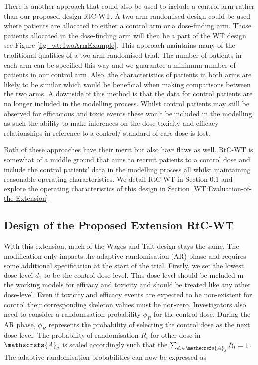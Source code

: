 There is another approach that could also be used to include a control arm rather than our proposed design RtC-WT. A two-arm randomised design could be used where patients are allocated to either a control arm or a dose-finding arm. Those patients allocated in the dose-finding arm will then be a part of the WT design see Figure \ref{fig_wt:TwoArmExample}. This approach maintains many of the traditional qualities of a two-arm randomised trial. The number of patients in each arm can be specified this way and we guarantee a minimum number of patients in our control arm. Also, the characteristics of patients in both arms are likely to be similar which would be beneficial when making comparisons between the two arms. A downside of this method is that the data for control patients are no longer included in the modelling process. Whilst control patients may still be observed for efficacious and toxic events these won't be included in the modelling as such the ability to make inferences on the dose-toxicity and efficacy relationships in reference to a control/ standard of care dose is lost. 

Both of these approaches have their merit but also have flaws as well. RtC-WT is somewhat of a middle ground that aims to recruit patients to a control dose and include the control patients' data in the modelling process all whilst maintaining reasonable operating characteristics. We detail RtC-WT in Section \ref{WT:Design-RtC-WT} and explore the operating characteristics of this design in Section \ref{WT:Evaluation-of-the-Extension}.

\subsection{Design of the Proposed Extension RtC-WT}
\label{WT:Design-RtC-WT}

With this extension, much of the Wages and Tait design stays the same. The modification only impacts the adaptive randomisation (AR) phase and requires some additional specification at the start of the trial. Firstly, we set the lowest dose-level $d_1$ to be the control dose-level. This dose-level should be included in the working models for efficacy and toxicity and should be treated like any other dose-level. Even if toxicity and efficacy events are expected to be non-existent for control their corresponding skeleton values must be non-zero. Investigators also need to consider a randomisation probability $\phi_R$ for the control dose. During the AR phase, $\phi_R$ represents the probability of selecting the control dose as the next dose level. The probability of randomisation $R_i$ for other dose in $\mathscrsfs{A}_j$ is scaled accordingly such that the $\sum_{d_i \in \mathscrsfs{A}_j} R_i = 1$. The adaptive randomisation probabilities can now be expressed as 

